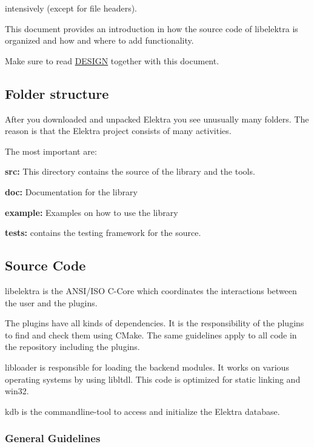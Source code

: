 intensively (except for file headers).

This document provides an introduction in how the source code of libelektra is organized and how and where to add functionality.

Make sure to read \hyperlink{doc_DESIGN_md}{D\+E\+S\+I\+G\+N} together with this document.

\subsection*{Folder structure}

After you downloaded and unpacked Elektra you see unusually many folders. The reason is that the Elektra project consists of many activities.

The most important are\+:


\begin{DoxyItemize}
\item {\bfseries src\+:} This directory contains the source of the library and the tools.
\item {\bfseries doc\+:} Documentation for the library
\item {\bfseries example\+:} Examples on how to use the library
\item {\bfseries tests\+:} contains the testing framework for the source.
\end{DoxyItemize}

\subsection*{Source Code}

libelektra is the A\+N\+S\+I/\+I\+S\+O C-\/\+Core which coordinates the interactions between the user and the plugins.

The plugins have all kinds of dependencies. It is the responsibility of the plugins to find and check them using C\+Make. The same guidelines apply to all code in the repository including the plugins.

{\ttfamily libloader} is responsible for loading the backend modules. It works on various operating systems by using {\ttfamily libltdl}. This code is optimized for static linking and win32.

kdb is the commandline-\/tool to access and initialize the Elektra database.

\subsubsection*{General Guidelines}

